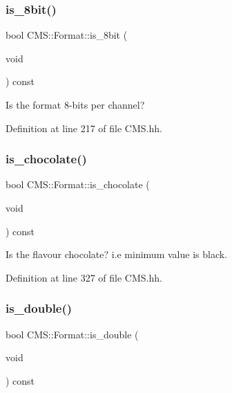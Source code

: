 \subsubsection{\texorpdfstring{is\+\_\+8bit()}{is\_8bit()}}
{\footnotesize\ttfamily bool C\+M\+S\+::\+Format\+::is\+\_\+8bit (\begin{DoxyParamCaption}\item[{void}]{ }\end{DoxyParamCaption}) const\hspace{0.3cm}{\ttfamily [inline]}}



Is the format 8-\/bits per channel? 



Definition at line 217 of file C\+M\+S.\+hh.

\mbox{\label{class_c_m_s_1_1_format_a3f4c0306ed08352ae89df359427be794}} 
\subsubsection{\texorpdfstring{is\+\_\+chocolate()}{is\_chocolate()}}
{\footnotesize\ttfamily bool C\+M\+S\+::\+Format\+::is\+\_\+chocolate (\begin{DoxyParamCaption}\item[{void}]{ }\end{DoxyParamCaption}) const\hspace{0.3cm}{\ttfamily [inline]}}



Is the flavour \textquotesingle{}chocolate\textquotesingle{}? i.\+e minimum value is black. 



Definition at line 327 of file C\+M\+S.\+hh.

\mbox{\label{class_c_m_s_1_1_format_aca27059973d6a9aba10b2d061f758d74}} 
\subsubsection{\texorpdfstring{is\+\_\+double()}{is\_double()}}
{\footnotesize\ttfamily bool C\+M\+S\+::\+Format\+::is\+\_\+double (\begin{DoxyParamCaption}\item[{void}]{ }\end{DoxyParamCaption}) const\hspace{0.3cm}{\ttfamily [inline]}}



